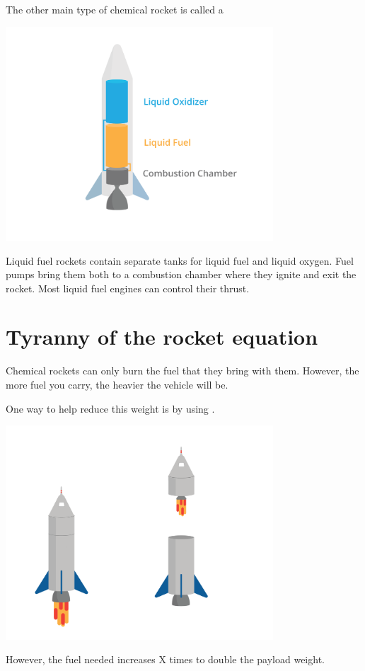 The other main type of chemical rocket is called a 

\includegraphics[width=0.75\textwidth]{liquid.png}

Liquid fuel rockets contain separate tanks for liquid fuel and liquid oxygen. Fuel pumps bring them both to a combustion chamber where they ignite and exit the rocket. Most liquid fuel engines can control their thrust. 


\section{Tyranny of the rocket equation}
	Chemical rockets can only burn the fuel that they bring with them. However, the more fuel you carry, the heavier the vehicle will be. 

	One way to help reduce this weight is by using . 

\includegraphics[width=0.75\textwidth]{stagingDual.png}


	However, the fuel needed increases X times to double the payload weight.

